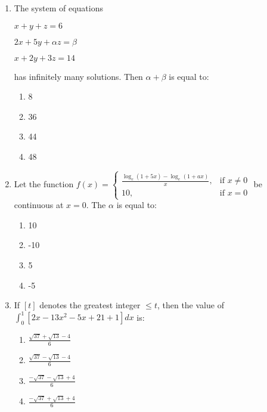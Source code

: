 \documentclass[journal]{IEEEtran}
\newcommand{\brak}[1]{\left( #1 \right)}
\newcommand{\sbrak}[1]{\left[ #1 \right]}
\begin{document}
\begin{enumerate}
    \item The system of equations

        $x + y + z = 6$
        
        $2x + 5y + \alpha z = \beta$
        
        $x + 2y + 3z = 14$
        
        has infinitely many solutions. Then $\alpha + \beta$ is equal to:
 
        \begin{multicols}{4}
        \begin{enumerate}
        \item 8
        \item 36
        \item 44
        \item 48
        \end{enumerate}
        \end{multicols}

    \item Let the function
        $f\brak{x}=\begin{cases}
        \frac{\log_{e}\brak{1+5x}-\log_{e}\brak{1+ax}}{x}, & \text{if } x\neq0 \\
        10, & \text{if } x=0
        \end{cases}$        
        be continuous at $x=0$. The $\alpha$ is equal to:
        
        \begin{multicols}{4}
        \begin{enumerate}
        \item 10
        \item -10
        \item 5
        \item -5
        \end{enumerate}
        \end{multicols}

    \item If $\sbrak{t}$ denotes the greatest integer $\leq t$, then the value of $\int_{0}^{1}\sbrak{2x-13x^{2}-5x+21+1}dx$ is:

        \begin{multicols}{4}
        \begin{enumerate}
        \item $\frac{\sqrt{37}+\sqrt{13}-4}{6}$
        \item $\frac{\sqrt{37}-\sqrt{13}-4}{6}$
        \item $\frac{-\sqrt{37}-\sqrt{13}+4}{6}$
        \item $\frac{-\sqrt{37}+\sqrt{13}+4}{6}$
        \end{enumerate}
        \end{multicols}


\end{enumerate}
\end{document}
